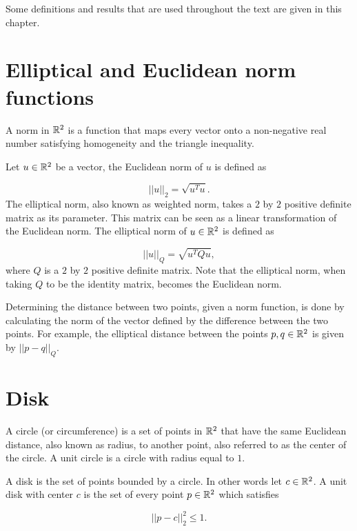 Some definitions and results that are used throughout the text are given in this chapter.

\section{Elliptical and Euclidean norm functions}

A norm in $\mathbb{R}^2$ is a function that maps every vector onto a non-negative real number satisfying homogeneity and the triangle inequality. 

Let $u \in \mathbb{R}^2$ be a vector, the Euclidean norm of $u$ is defined as

\begin{equation}\label{eq:norm2}
||u||_2 = \sqrt{u^{T}u}.
\end{equation}
The elliptical norm, also known as weighted norm, takes a $2$ by $2$ positive definite matrix as its parameter. This matrix can be seen as a linear transformation of the Euclidean norm. The elliptical norm of $u \in\mathbb{R}^2$ is defined as 

\begin{equation}
||u||_{Q} = \sqrt{u^{T}Qu},
\end{equation}
where $Q$ is a $2$ by $2$ positive definite matrix. Note that the elliptical norm, when taking $Q$ to be the identity matrix, becomes the Euclidean norm.

Determining the distance between two points, given a norm function, is done by calculating the norm of the vector defined by the difference between the two points. For example, the elliptical distance between the points $p,q \in \mathbb{R}^2$ is given by $||p-q||_{Q}$.

\section{Disk}

A circle (or circumference) is a set of points in $\mathbb{R}^2$ that have the same Euclidean distance, also known as radius, to another point, also referred to as the center of the circle. A unit circle is a circle with radius equal to $1$.

A disk is the set of points bounded by a circle. In other words let $c \in \mathbb{R}^2$. A unit disk with center $c$ is the set of every point $p \in \mathbb{R}^2$ which satisfies

\begin{equation}\label{eq:disk}
||p-c||_2^2 \le 1.
\end{equation} 

